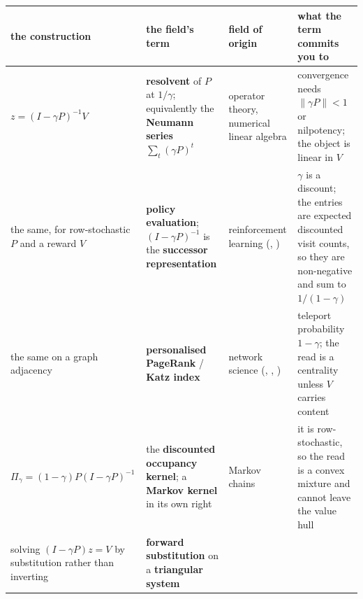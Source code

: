 \documentclass[11pt,a4paper]{article}
\newcounter{none}                 %
\theoremstyle{plain}
\theoremstyle{definition}
\theoremstyle{remark}
\begin{document}
{\def\LTcaptype{none} %
\begin{longtable}[]{@{}
  >{\raggedright\arraybackslash}p{}
  >{\raggedright\arraybackslash}p{}
  >{\raggedright\arraybackslash}p{}
  >{\raggedright\arraybackslash}p{}@{}}
\toprule\noalign{}
\begin{minipage}[b]{\linewidth}\raggedright
the construction
\end{minipage} & \begin{minipage}[b]{\linewidth}\raggedright
the field's term
\end{minipage} & \begin{minipage}[b]{\linewidth}\raggedright
field of origin
\end{minipage} & \begin{minipage}[b]{\linewidth}\raggedright
what the term commits you to
\end{minipage} \\
\midrule\noalign{}
\endhead
\bottomrule\noalign{}
\endlastfoot
\(z=(I-\gamma P)^{-1}V\) & \textbf{resolvent} of \(P\) at \(1/\gamma\);
equivalently the \textbf{Neumann series} \(\sum_t (\gamma P)^t\) &
operator theory, numerical linear algebra & convergence needs
\(\|\gamma P\|<1\) or nilpotency; the object is linear in \(V\) \\
the same, for row-stochastic \(P\) and a reward \(V\) & \textbf{policy
evaluation}; \((I-\gamma P)^{-1}\) is the \textbf{successor
representation} & reinforcement learning
(\citep{bellman-1957-markovian}, \citep{dayan-1993-successor}) &
\(\gamma\) is a discount; the entries are expected discounted visit
counts, so they are non-negative and sum to \(1/(1-\gamma)\) \\
the same on a graph adjacency & \textbf{personalised PageRank} /
\textbf{Katz index} & network science (\citep{katz-1953-status},
\citep{brin-1998-anatomy}, \citep{gasteiger-2019-appnp}) & teleport
probability \(1-\gamma\); the read is a centrality unless \(V\) carries
content \\
\(\Pi_\gamma=(1-\gamma)P(I-\gamma P)^{-1}\) & the \textbf{discounted
occupancy kernel}; a \textbf{Markov kernel} in its own right & Markov
chains & it is row-stochastic, so the read is a convex mixture and
cannot leave the value hull \\
solving \((I-\gamma P)z=V\) by substitution rather than inverting &
\textbf{forward substitution} on a \textbf{triangular system} &

\end{longtable}}
\end{document}
